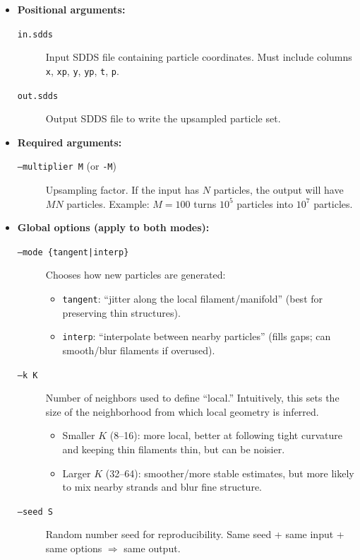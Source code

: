\documentclass[11pt]{article}
\begin{document}
\begin{itemize}
\item \textbf{Positional arguments:}
  \begin{description}
  \item[\texttt{in.sdds}] Input SDDS file containing particle coordinates. Must include columns
    \texttt{x}, \texttt{xp}, \texttt{y}, \texttt{yp}, \texttt{t}, \texttt{p}.
  \item[\texttt{out.sdds}] Output SDDS file to write the upsampled particle set.
  \end{description}
\item \textbf{Required arguments:}
\begin{description}
  \item[\texttt{--multiplier M} (or \texttt{-M})] Upsampling factor. If the input has $N$ particles, the output will have $M N$ particles. Example: $M=100$ turns $10^5$ particles into $10^7$ particles.
\end{description}
\item \textbf{Global options (apply to both modes):}
\begin{description}
  \item[\texttt{--mode \{tangent|interp\}}] Chooses how new particles are generated:
  \begin{itemize}
    \item \texttt{tangent}: ``jitter along the local filament/manifold'' (best for preserving thin structures).
    \item \texttt{interp}: ``interpolate between nearby particles'' (fills gaps; can smooth/blur filaments if overused).
  \end{itemize}

  \item[\texttt{--k K}] Number of neighbors used to define ``local.'' Intuitively, this sets the size of the neighborhood from which local geometry is inferred.
  \begin{itemize}
    \item Smaller $K$ (8--16): more local, better at following tight curvature and keeping thin filaments thin, but can be noisier.
    \item Larger $K$ (32--64): smoother/more stable estimates, but more likely to mix nearby strands and blur fine structure.
  \end{itemize}

  \item[\texttt{--seed S}] Random number seed for reproducibility. Same seed + same input + same options $\Rightarrow$ same output.
\end{description}


\end{itemize}
\end{document}
